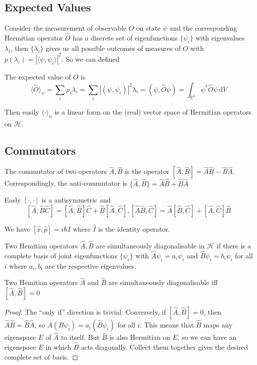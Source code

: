 \subsection{Expected Values}
Consider the measurement of observable $O$ on state $\psi$ and the corresponding Hermitian operator $\hat{O}$ has a discrete set of eigenfunctions $\{\psi_i\}$ with eigenvalues $\lambda_i$, then $\{\lambda_i\}$ gives us all possible outcomes of measures of $O$ with $p(\lambda_i)=|\langle\psi,\psi_i\rangle|^2$.
So we can defined\begin{definition}
    The expected value of $O$ is
    $$\langle\hat{O}\rangle_\psi=\sum_ip_i\lambda_i=\sum_i|(\psi,\psi_i)|^2\lambda_i=(\psi,\hat{O}\psi)=\int_{\mathbb R^3}\psi^*\hat{O}\psi\,\mathrm dV$$
\end{definition}
Then easily $\langle\cdot\rangle_\psi$ is a linear form on the (real) vector space of Hermitian operators on $\mathcal H$.
\subsection{Commutators}
\begin{definition}
    The commutator of two operators $\hat{A},\hat{B}$ is the operator $[\hat{A},\hat{B}]=\hat{A}\hat{B}-\hat{B}\hat{A}$.
    Correspondingly, the anti-commutator is $\{\hat{A},\hat{B}\}=\hat{A}\hat{B}+\hat{B}\hat{A}$
\end{definition}
Easly $[\cdot,\cdot]$ is a antisymmetric and
$$[\hat{A},\hat{B}\hat{C}]=[\hat{A},\hat{B}]\hat{C}+\hat{B}[\hat{A},\hat{C}],[\hat{A}\hat{B},\hat{C}]=\hat{A}[\hat{B},\hat{C}]+[\hat{A},\hat{C}]\hat{B}$$
\begin{example}
    We have $[\hat{x},\hat{p}]=i\hbar\hat{I}$ where $\hat{I}$ is the identity operator.
\end{example}
\begin{definition}
    Two Hemitian operators $\hat{A},\hat{B}$ are simultaneously diagonalisable in $\mathcal H$ if there is a complete basis of joint eigenfunctions $\{\psi_i\}$ with $\hat{A}\psi_i=a_i\psi_i$ and $\hat{B}\psi_i=b_i\psi_i$ for all $i$ where $a_i,b_i$ are the respective eigenvalues.
\end{definition}
\begin{theorem}
    Two Hemitian operators $\hat{A}$ and $\hat{B}$ are simultaneously diagonalisable iff $[\hat{A},\hat{B}]=0$
\end{theorem}
\begin{proof}
    The ``only if'' direction is trivial.
    Conversely, if $[\hat{A},\hat{B}]=0$, then $\hat{A}\hat{B}=\hat{B}\hat{A}$, so $A(B\psi_i)=a_i(\hat{B}\psi_i)$ for all $i$.
    This means that $\hat{B}$ maps any eigenspace $E$ of $\hat{A}$ to itself.
    But $\hat{B}$ is also Hermitian on $E$, so we can have an eigenspace $E$ in which $\hat{B}$ acts diagonally.
    Collect them together gives the desired complete set of basis.
\end{proof}
